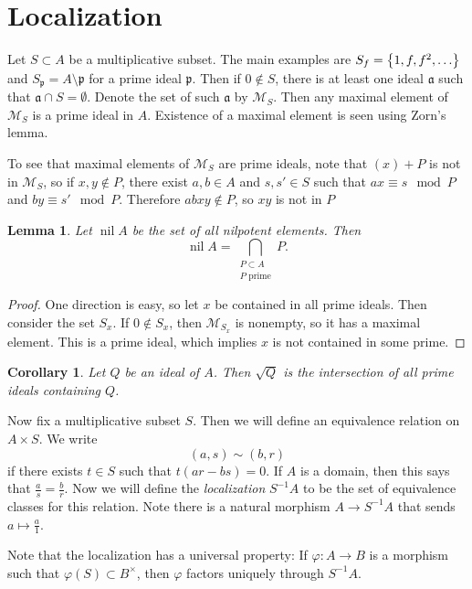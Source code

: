 \documentclass[leqno, openany]{memoir}
\newtheorem{cor}[thm]{Corollary}
\newtheorem{lem}[thm]{Lemma}
\theoremstyle{definition}
\theoremstyle{remark}
\theoremstyle{plain}
\theoremstyle{definition}
\theoremstyle{remark}
\newcommand{\mc}[1]{\mathcal{#1}}
\newcommand{\mf}[1]{\mathfrak{#1}}
\begin{document}
\section{Localization}%
\label{sec:localization}

Let $S \subset A$ be a multiplicative subset. The main examples are $S_f = \qty{1,f,f^2, \ldots}$ and $S_{\mf{p}} = A \setminus \mf{p}$ for a prime ideal $\mf{p}$. Then if $0 \notin S$, there is at least one ideal $\mf{a}$ such that $\mf{a} \cap S = \emptyset$. Denote the set of such $\mf{a}$ by $\mc{M}_S$. Then any maximal element of $\mc{M}_S$ is a prime ideal in $A$. Existence of a maximal element is seen using Zorn's lemma.

To see that maximal elements of $\mc{M}_S$ are prime ideals, note that $(x) + P$ is not in $\mc{M}_S$, so if $x,y \notin P$, there exist $a,b \in A$ and $s,s' \in S$ such that $ax \equiv s \mod P$ and $by \equiv s' \mod P$. Therefore $abxy \notin P$, so $xy$ is not in $P$

\begin{lem}
Let $\operatorname{nil} A$ be the set of all nilpotent elements. Then 
\[ \operatorname{nil} A = \bigcap_{\substack{P \subset A \\ P \text{ prime}}} P. \]
\end{lem}

\begin{proof}
    One direction is easy, so let $x$ be contained in all prime ideals. Then consider the set $S_x$. If $0 \notin S_x$, then $\mc{M}_{S_x}$ is nonempty, so it has a maximal element. This is a prime ideal, which implies $x$ is not contained in some prime.
\end{proof}

\begin{cor}
    Let $Q$ be an ideal of $A$. Then $\sqrt{Q}$ is the intersection of all prime ideals containing $Q$.
\end{cor}

Now fix a multiplicative subset $S$. Then we will define an equivalence relation on $A \times S$. We write
\[ (a,s) \sim (b,r) \]
if there exists $t \in S$ such that $t(ar - bs) = 0$. If $A$ is a domain, then this says that $\frac{a}{s} = \frac{b}{r}$. Now we will define the \textit{localization} $S^{-1}A$ to be the set of equivalence classes for this relation. Note there is a natural morphism $A \to S^{-1}A$ that sends $a \mapsto \frac{a}{1}$.

Note that the localization has a universal property: If $\varphi:A \to B$ is a morphism such that $\varphi(S) \subset B^{\times}$, then $\varphi$ factors uniquely through $S^{-1}A$.
\end{document}
